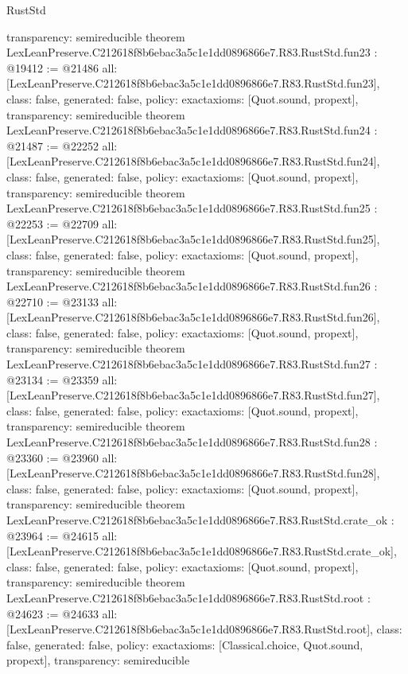 \begin{lexlean}{RustStd}
\begin{coremodule}
{  transparency: semireducible
}
theorem LexLeanPreserve.C212618f8b6ebac3a5c1e1dd0896866e7.R83.RustStd.fun23 : @19412 := @21486 {
  all: [LexLeanPreserve.C212618f8b6ebac3a5c1e1dd0896866e7.R83.RustStd.fun23],
  class: false,
  generated: false,
  policy: exact{axioms: [Quot.sound, propext]},
  transparency: semireducible
}
theorem LexLeanPreserve.C212618f8b6ebac3a5c1e1dd0896866e7.R83.RustStd.fun24 : @21487 := @22252 {
  all: [LexLeanPreserve.C212618f8b6ebac3a5c1e1dd0896866e7.R83.RustStd.fun24],
  class: false,
  generated: false,
  policy: exact{axioms: [Quot.sound, propext]},
  transparency: semireducible
}
theorem LexLeanPreserve.C212618f8b6ebac3a5c1e1dd0896866e7.R83.RustStd.fun25 : @22253 := @22709 {
  all: [LexLeanPreserve.C212618f8b6ebac3a5c1e1dd0896866e7.R83.RustStd.fun25],
  class: false,
  generated: false,
  policy: exact{axioms: [Quot.sound, propext]},
  transparency: semireducible
}
theorem LexLeanPreserve.C212618f8b6ebac3a5c1e1dd0896866e7.R83.RustStd.fun26 : @22710 := @23133 {
  all: [LexLeanPreserve.C212618f8b6ebac3a5c1e1dd0896866e7.R83.RustStd.fun26],
  class: false,
  generated: false,
  policy: exact{axioms: [Quot.sound, propext]},
  transparency: semireducible
}
theorem LexLeanPreserve.C212618f8b6ebac3a5c1e1dd0896866e7.R83.RustStd.fun27 : @23134 := @23359 {
  all: [LexLeanPreserve.C212618f8b6ebac3a5c1e1dd0896866e7.R83.RustStd.fun27],
  class: false,
  generated: false,
  policy: exact{axioms: [Quot.sound, propext]},
  transparency: semireducible
}
theorem LexLeanPreserve.C212618f8b6ebac3a5c1e1dd0896866e7.R83.RustStd.fun28 : @23360 := @23960 {
  all: [LexLeanPreserve.C212618f8b6ebac3a5c1e1dd0896866e7.R83.RustStd.fun28],
  class: false,
  generated: false,
  policy: exact{axioms: [Quot.sound, propext]},
  transparency: semireducible
}
theorem LexLeanPreserve.C212618f8b6ebac3a5c1e1dd0896866e7.R83.RustStd.crate_ok : @23964 := @24615 {
  all: [LexLeanPreserve.C212618f8b6ebac3a5c1e1dd0896866e7.R83.RustStd.crate_ok],
  class: false,
  generated: false,
  policy: exact{axioms: [Quot.sound, propext]},
  transparency: semireducible
}
theorem LexLeanPreserve.C212618f8b6ebac3a5c1e1dd0896866e7.R83.RustStd.root : @24623 := @24633 {
  all: [LexLeanPreserve.C212618f8b6ebac3a5c1e1dd0896866e7.R83.RustStd.root],
  class: false,
  generated: false,
  policy: exact{axioms: [Classical.choice, Quot.sound, propext]},
  transparency: semireducible
}


\end{coremodule}
\end{lexlean}
